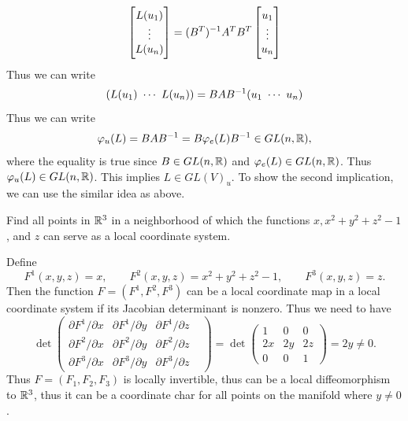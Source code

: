 \begin{solution}
	\[ 
	\begin{bmatrix}
		L(u_1) \\
		\vdots \\
		L(u_n)
	\end{bmatrix}=
	(B^T)^{-1}A^T B^T
	\begin{bmatrix}
		u_1 \\
		\vdots \\
		u_n
	\end{bmatrix}
	\]
	Thus we can write
	\[ (L(u_1)\ \cdots\ L(u_n)) = BA\inv{B} (u_1\ \cdots\ u_n) \]
	Thus we can write
	\[ \varphi_u(L) = BAB^{-1} = B\varphi_e(L) B^{-1} \in GL(n,\mathbb{R}), \]
	where the equality is true since $ B \in GL(n,\mathbb{R}) $ and $ \varphi_e(L) \in GL(n,\mathbb{R}) $. Thus $ \varphi_u(L) \in GL(n,\mathbb{R}) $. This implies $ L \in GL(V)_u $. To show the second implication, we can use the similar idea as above.
	
\end{solution}

\begin{problem}
	Find all points in $ \mathbb{R}^3 $ in a neighborhood of which the functions $ x, x^2 + y^2 + z^2 -1 $, and $ z $ can serve as a local coordinate system.
\end{problem}
\begin{solution}
	Define 
	\[ F^1 (x,y,z) = x, \qquad F^2(x,y,z) = x^2 + y^2 + z^2 -1, \qquad F^3(x,y,z) = z. \]
	Then the function $ F = (F^1,F^2,F^3) $ can be a local coordinate map in a local coordinate system if its Jacobian determinant is nonzero. Thus we need to have
	\[ \det
	\begin{pmatrix}
		\partial F^1/\partial x & \partial F^1/\partial y & \partial F^1/\partial z&  \\
		\partial F^2/\partial x & \partial F^2/\partial y & \partial F^2/\partial z&  \\
		\partial F^3/\partial x & \partial F^3/\partial y & \partial F^3/\partial z& 
	\end{pmatrix}
	= \det
	\begin{pmatrix}
		1 & 0 & 0 \\
		2x & 2y & 2z \\
		0 & 0 & 1
	\end{pmatrix}
	= 2y \neq 0.
	 \]
	Thus $ F = (F_1,F_2,F_3) $ is locally invertible, thus can be a local diffeomorphism to $ \mathbb{R}^3 $, thus it can be a coordinate char for all points on the manifold where $ y \neq 0 $.
\end{solution}